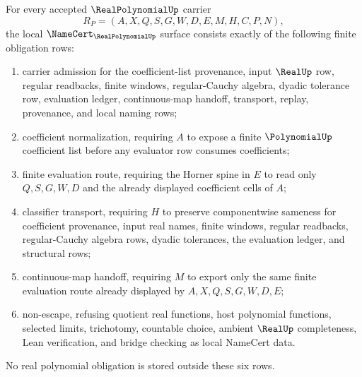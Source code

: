 \begin{theorem}
\label{thm:real-polynomial-namecert-obligations}
For every accepted $\RealPolynomialUp$ carrier
$$
R_P=(A,X,Q,S,G,W,D,E,M,H,C,P,N),
$$
the local $\NameCert_{\RealPolynomialUp}$ surface consists exactly of the following finite obligation rows:
\begin{enumerate}
\item carrier admission for the coefficient-list provenance, input $\RealUp$ row, regular readbacks, finite windows, regular-Cauchy algebra, dyadic tolerance row, evaluation ledger, continuous-map handoff, transport, replay, provenance, and local naming rows;
\item coefficient normalization, requiring $A$ to expose a finite $\PolynomialUp$ coefficient list before any evaluator row consumes coefficients;
\item finite evaluation route, requiring the Horner spine in $E$ to read only $Q,S,G,W,D$ and the already displayed coefficient cells of $A$;
\item classifier transport, requiring $H$ to preserve componentwise sameness for coefficient provenance, input real names, finite windows, regular readbacks, regular-Cauchy algebra rows, dyadic tolerances, the evaluation ledger, and structural rows;
\item continuous-map handoff, requiring $M$ to export only the same finite evaluation route already displayed by $A,X,Q,S,G,W,D,E$;
\item non-escape, refusing quotient real functions, host polynomial functions, selected limits, trichotomy, countable choice, ambient $\RealUp$ completeness, Lean verification, and bridge checking as local NameCert data.
\end{enumerate}
No real polynomial obligation is stored outside these six rows.
\end{theorem}
